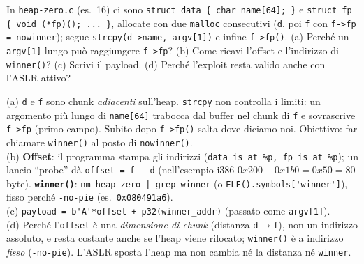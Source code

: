 \question[7]
In \lstinline|heap-zero.c| (es.\ 16) ci sono \lstinline|struct data { char name[64]; }| e \lstinline|struct fp { void (*fp)(); ... }|, allocate con due \lstinline|malloc| consecutivi (\lstinline|d|, poi \lstinline|f| con \lstinline|f->fp = nowinner|); segue \lstinline|strcpy(d->name, argv[1])| e infine \lstinline|f->fp()|.
(a) Perché un \lstinline|argv[1]| lungo può raggiungere \lstinline|f->fp|? (b) Come ricavi l'offset e l'indirizzo di \lstinline|winner()|? (c) Scrivi il payload. (d) Perché l'exploit resta valido anche con l'ASLR attivo?
\begin{solution}
(a) \lstinline|d| e \lstinline|f| sono chunk \emph{adiacenti} sull'heap. \lstinline|strcpy| non controlla i limiti: un argomento più lungo di \lstinline|name[64]| trabocca dal buffer nel chunk di \lstinline|f| e sovrascrive \lstinline|f->fp| (primo campo). Subito dopo \lstinline|f->fp()| salta dove diciamo noi. Obiettivo: far chiamare \lstinline|winner()| al posto di \lstinline|nowinner()|.\\
(b) \textbf{Offset}: il programma stampa gli indirizzi (\lstinline|data is at %p, fp is at %p|); un lancio ``probe'' dà \lstinline|offset = f - d| (nell'esempio i386 $0x200-0x1b0 = 0x50 = 80$ byte). \textbf{\texttt{winner()}}: \lstinline!nm heap-zero | grep winner! (o \lstinline|ELF().symbols['winner']|), fisso perché \lstinline|-no-pie| (es.\ \lstinline|0x080491a6|).\\
(c) \lstinline|payload = b'A'*offset + p32(winner_addr)| (passato come \lstinline|argv[1]|).\\
(d) Perché l'\lstinline|offset| è una \emph{dimensione di chunk} (distanza \lstinline|d|$\to$\lstinline|f|), non un indirizzo assoluto, e resta costante anche se l'heap viene rilocato; \lstinline|winner()| è a indirizzo \emph{fisso} (\lstinline|-no-pie|). L'ASLR sposta l'heap ma non cambia né la distanza né \lstinline|winner|.
\end{solution}
